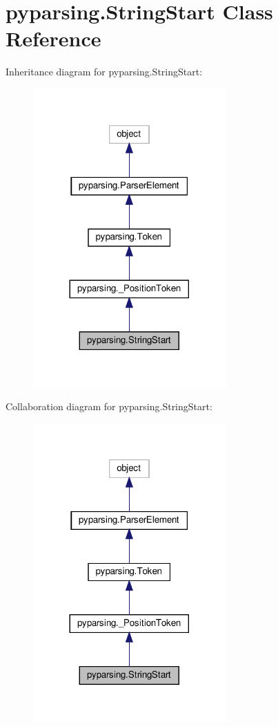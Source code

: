 \hypertarget{classpyparsing_1_1StringStart}{}\section{pyparsing.\+String\+Start Class Reference}
\label{classpyparsing_1_1StringStart}


Inheritance diagram for pyparsing.\+String\+Start\+:
\nopagebreak
\begin{figure}[H]
\begin{center}
\leavevmode
\includegraphics[width=209pt]{classpyparsing_1_1StringStart__inherit__graph}
\end{center}
\end{figure}


Collaboration diagram for pyparsing.\+String\+Start\+:
\nopagebreak
\begin{figure}[H]
\begin{center}
\leavevmode
\includegraphics[width=209pt]{classpyparsing_1_1StringStart__coll__graph}
\end{center}
\end{figure}
